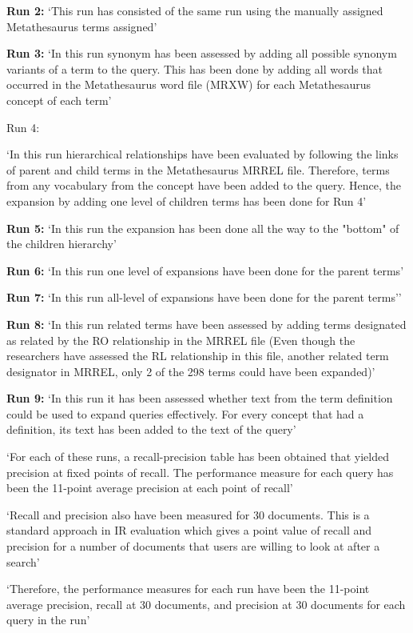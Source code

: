 \documentclass[]{article}
\begin{document}
{{{\textbf{Run 2:} ‘This run has consisted of the same run using the manually assigned Metathesaurus terms assigned’ 

\textbf{Run 3:} ‘In this run synonym has been assessed by adding all possible synonym variants of a term to the query. This has been done by adding all words that occurred in the Metathesaurus word file (MRXW) for each Metathesaurus concept of each term’ 

\textbf{}Run 4:} ‘In this run hierarchical relationships have been evaluated by following the links of parent and child terms in the Metathesaurus MRREL file. Therefore, terms from any vocabulary from the concept have been added to the query. Hence, the expansion by adding one level of children terms has been done for Run 4’

\textbf{Run 5:} ‘In this run the expansion has been done all the way to the "bottom" of the children hierarchy’ 

\textbf{Run 6:} ‘In this run one level of expansions have been done for the parent terms’

\textbf{Run 7:} ‘In this run all-level of expansions have been done for the parent terms’’

\textbf{Run 8:} ‘In this run related terms have been assessed by adding terms designated as related by the RO relationship in the MRREL file (Even though the researchers have assessed the RL relationship in this file, another related term designator in MRREL, only 2 of the 298 terms could have been expanded)’

\textbf{Run 9:} ‘In this run it has been assessed whether text from the term definition could be used to expand queries effectively. For every concept that had a definition, its text has been added to the text of the query’

‘For each of these runs, a recall-precision table has been obtained that yielded precision at fixed points of recall. The performance measure for each query has been the 11-point average precision at each point of recall’

‘Recall and precision also have been measured for 30 documents. This is a standard approach in IR evaluation which gives a point value of recall and precision for a number of documents that users are willing to look at after a search’

‘Therefore, the performance measures for each run have been the 11-point average precision, recall at 30 documents, and precision at 30 documents for each query in the run’ 

}}
\end{document}

